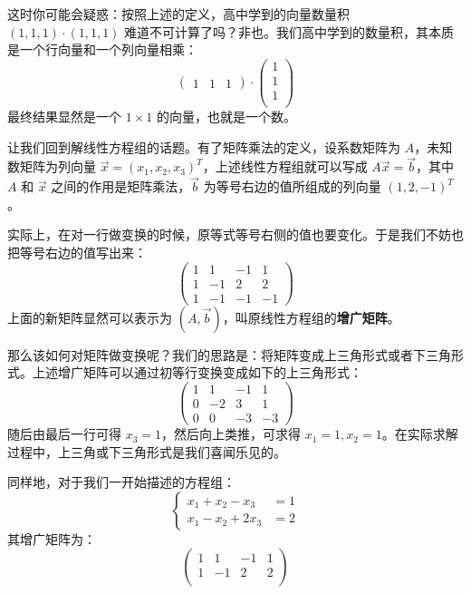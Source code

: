 \documentclass[b5paper]{ctexart}
\begin{document}
	这时你可能会疑惑：按照上述的定义，高中学到的向量数量积 $(1, 1, 1) \cdot (1, 1, 1)$ 难道不可计算了吗？非也。我们高中学到的数量积，其本质是一个行向量和一个列向量相乘：
	\[
	\begin{pmatrix}
		1 & 1 & 1
	\end{pmatrix} \cdot
	\begin{pmatrix}
		1 \\ 1 \\ 1\\
	\end{pmatrix}
	\]
	最终结果显然是一个 $1 \times 1$ 的向量，也就是一个数。
	
	让我们回到解线性方程组的话题。有了矩阵乘法的定义，设系数矩阵为 $A$，未知数矩阵为列向量 $\vec{x} = (x_1, x_2, x_3)^T$，上述线性方程组就可以写成 $A\vec{x} = \vec{b}$，其中 $A$ 和 $\vec{x}$ 之间的作用是矩阵乘法，$\vec{b}$ 为等号右边的值所组成的列向量 $(1, 2, -1)^T$。
	
	实际上，在对一行做变换的时候，原等式等号右侧的值也要变化。于是我们不妨也把等号右边的值写出来：
	\[
	\begin{pmatrix}
		1 & 1 & -1 & 1\\
		1 & -1 & 2 & 2 \\
		1 & -1 & -1 & -1
	\end{pmatrix}
	\]
	上面的新矩阵显然可以表示为 $(A, \vec{b})$，叫原线性方程组的\textbf{增广矩阵}。
	
	那么该如何对矩阵做变换呢？我们的思路是：将矩阵变成上三角形式或者下三角形式。上述增广矩阵可以通过初等行变换变成如下的上三角形式：
	\[
	\begin{pmatrix}
		1 & 1 & -1 & 1\\
		0 & -2 & 3 & 1 \\
		0 & 0 & -3 & -3
	\end{pmatrix}
	\]
	随后由最后一行可得 $x_3 = 1$，然后向上类推，可求得 $x_1 = 1, x_2 = 1$。在实际求解过程中，上三角或下三角形式是我们喜闻乐见的。
	
	同样地，对于我们一开始描述的方程组：
	\begin{equation*}
		\begin{cases}
			x_1 + x_2 - x_3 &= 1 \\
			x_1 - x_2 + 2x_3 &= 2 
		\end{cases}
	\end{equation*}
	其增广矩阵为：
		\[
	\begin{pmatrix}
		1 & 1 & -1 & 1\\
		1 & -1 & 2 & 2 \\
	\end{pmatrix}
	\]
	
\end{document}

